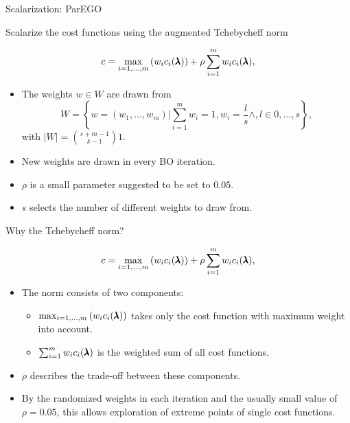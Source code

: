 \begin{frame}{Scalarization: ParEGO~}

    Scalarize the cost functions using the augmented Tchebycheff norm

    $$
    c = \max_{i=1,\dots,m}\left(w_i c_i(\pmb{\lambda})\right) + \rho \sum_{i=1}^m w_ic_i(\pmb{\lambda}),
    $$

    \begin{itemize}
        \item The weights $w \in W$ are drawn from
            $$
                W = \left\{ w = (w_1, \dots, w_m) | \sum_{i=1}^m w_i = 1, w_i = \frac{l}{s} \wedge, l \in 0,\dots,s\right\},
            $$
            with $|W| = {{s+m-1}\choose{k-1}}1$.
        \item New weights are drawn in every BO iteration.
        \item $\rho$ is a small parameter suggested to be set to $0.05$.
        \item $s$ selects the number of different weights to draw from.
    \end{itemize}

\end{frame}

\begin{frame}{Why the Tchebycheff norm?}


    $$
    c = \max_{i=1,\dots,m}\left(w_i c_i(\pmb{\lambda})\right) + \rho \sum_{i=1}^m w_ic_i(\pmb{\lambda}),
    $$

    \begin{itemize}
        \item The norm consists of two components:
            \begin{itemize}
                    \item $\max_{i=1,\dots,m}\left(w_i c_i(\pmb{\lambda})\right)$ takes only the cost function with maximum weight into account.
                    \item $\sum_{i=1}^m w_ic_i(\pmb{\lambda})$ is the weighted sum of all cost functions.
            \end{itemize}
        \item $\rho$ describes the trade-off between these components.
        \item By the randomized weights in each iteration and the usually small value of $\rho = 0.05$, this allows exploration of extreme points of single cost functions.
    \end{itemize}

\end{frame}

